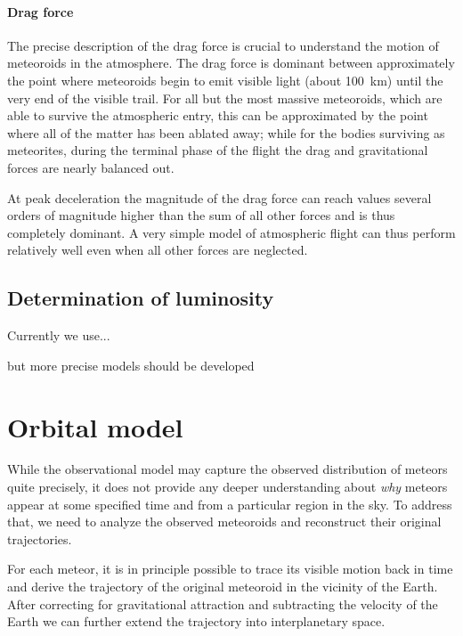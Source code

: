            \paragraph{Drag force} \label{said}
                The precise description of the drag force is crucial to understand the motion
                of meteoroids in the atmosphere. The drag force is dominant between approximately
                the point where meteoroids begin to emit visible light (about \SI{100}{\kilo\metre})
                until the very end of the visible trail. For all but the most massive meteoroids,
                which are able to survive the atmospheric entry, this can be approximated
                by the point where all of the matter has been ablated away; while for the bodies
                surviving as meteorites, during the terminal phase of the flight the drag and
                gravitational forces are nearly balanced out.

                At peak deceleration the magnitude of the drag force can reach values several orders of magnitude
                higher than the sum of all other forces and is thus completely dominant.
                A very simple model of atmospheric flight can thus perform relatively
                well even when all other forces are neglected.

    \subsection{Determination of luminosity} \label{sail}
        Currently we use... \citep{hill+2005} 

        \citep{bronshten1983}
        but more precise models should be developed


\section{Orbital model} \label{mo}
    While the observational model may capture the observed distribution of meteors quite precisely,
    it does not provide any deeper understanding about \textit{why} meteors appear
    at some specified time and from a particular region in the sky.
    To address that, we need to analyze the observed meteoroids and reconstruct their original trajectories.

    For each meteor, it is in principle possible to trace its visible motion back in time
    and derive the trajectory of the original meteoroid in the vicinity of the Earth.
    After correcting for gravitational attraction and subtracting the velocity of the Earth
    we can further extend the trajectory into interplanetary space.

